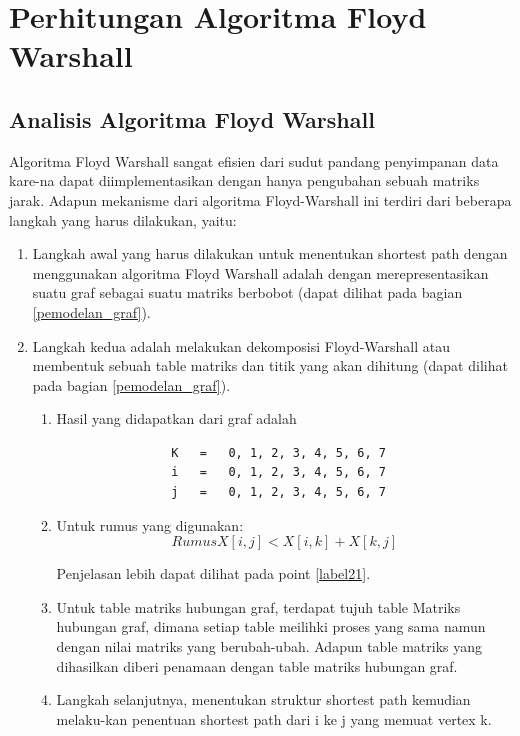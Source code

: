 \section{Perhitungan Algoritma Floyd Warshall}
\subsection{Analisis Algoritma Floyd Warshall}
Algoritma Floyd Warshall sangat efisien dari sudut pandang penyimpanan data kare-na dapat diimplementasikan dengan hanya pengubahan sebuah matriks jarak. Adapun mekanisme dari algoritma Floyd-Warshall ini terdiri dari beberapa langkah yang harus dilakukan, yaitu:

\begin{enumerate}
    \item Langkah awal yang harus dilakukan untuk menentukan shortest path dengan menggunakan algoritma Floyd Warshall adalah dengan merepresentasikan suatu graf sebagai suatu matriks berbobot (dapat dilihat pada bagian \ref{pemodelan_graf}).
    \item Langkah kedua adalah melakukan dekomposisi Floyd-Warshall atau membentuk sebuah table matriks dan titik yang akan dihitung (dapat dilihat pada bagian \ref{pemodelan_graf}).
    
    \begin{enumerate}
        \item Hasil yang didapatkan dari graf adalah
            \begin{verbatim}
                K	=	0, 1, 2, 3, 4, 5, 6, 7
                i	=	0, 1, 2, 3, 4, 5, 6, 7
                j	=	0, 1, 2, 3, 4, 5, 6, 7
            \end{verbatim}
        
        \item Untuk rumus yang digunakan:
            \begin{equation}
                Rumus X[i,j] < X[i,k] + X[k,j]
            \end{equation}
            \par Penjelasan lebih dapat dilihat pada point \ref{label21}.
        
        \item Untuk table matriks hubungan graf, terdapat tujuh table Matriks hubungan graf, dimana setiap table meilihki proses yang sama namun dengan nilai matriks yang berubah-ubah. Adapun table matriks yang dihasilkan diberi penamaan dengan table matriks hubungan graf.
        
        \item Langkah selanjutnya, menentukan struktur shortest path kemudian melaku-kan penentuan shortest path dari i ke j yang memuat vertex k.



\end{enumerate}
\end{enumerate}
